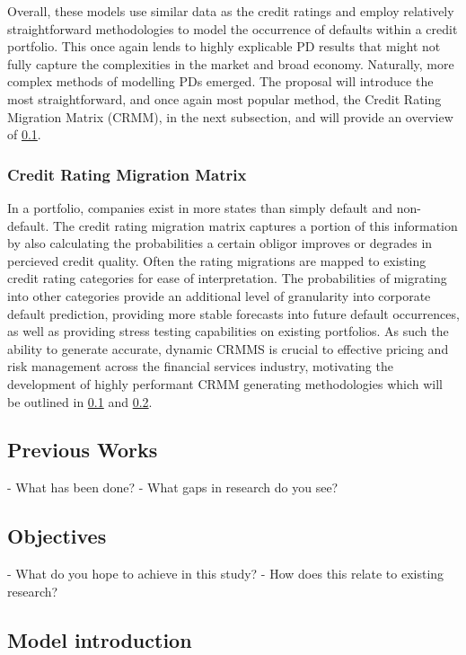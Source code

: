 \documentclass[10pt]{article}
\begin{document}
\begin{multicols*}{2}
Overall, these models use similar data as the credit ratings and employ relatively straightforward methodologies to model the occurrence of defaults within a credit portfolio. This once again lends to highly explicable PD results that might not fully capture the complexities in the market and broad economy.
Naturally, more complex methods of modelling PDs emerged. The proposal will introduce the most straightforward, and once again most popular method, the Credit Rating Migration Matrix (CRMM), in the next subsection, and will provide an overview of  \ref{lit-review}.

\subsubsection{Credit Rating Migration Matrix}\label{CRMM}

In a portfolio, companies exist in more states than simply default and non-default. The credit rating migration matrix captures a portion of this information by also calculating the probabilities a certain obligor improves or degrades in percieved credit quality. 
Often the rating migrations are mapped to existing credit rating categories for ease of interpretation. The probabilities of migrating into other categories provide an additional level of granularity into corporate default prediction, providing more stable forecasts into future default occurrences, 
as well as providing stress testing capabilities on existing portfolios. As such the ability to generate accurate, dynamic CRMMS is crucial to effective pricing and risk management across the financial services industry, motivating the development of highly performant CRMM generating methodologies which will be outlined in \ref{lit-review} and \ref{objectives}.

\subsection{Previous Works}\label{lit-review}

- What has been done?
- What gaps in research do you see?

\subsection{Objectives}\label{objectives}

- What do you hope to achieve in this study?
- How does this relate to existing research?

\subsection{Model introduction}\label{data}


\end{multicols*}
\end{document}
